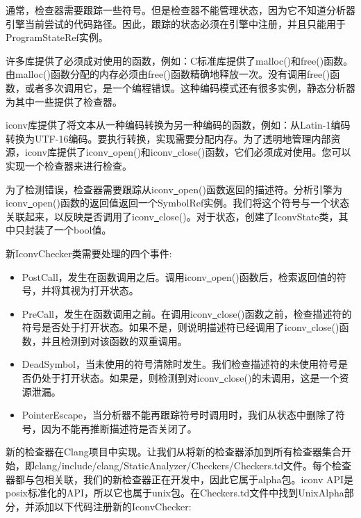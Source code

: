 通常，检查器需要跟踪一些符号。但是检查器不能管理状态，因为它不知道分析器引擎当前尝试的代码路径。因此，跟踪的状态必须在引擎中注册，并且只能用于ProgramStateRef实例。\par

许多库提供了必须成对使用的函数，例如：C标准库提供了malloc()和free()函数。由malloc()函数分配的内存必须由free()函数精确地释放一次。没有调用free()函数，或者多次调用它，是一个编程错误。这种编码模式还有很多实例，静态分析器为其中一些提供了检查器。\par

iconv库提供了将文本从一种编码转换为另一种编码的函数，例如：从Latin-1编码转换为UTF-16编码。要执行转换，实现需要分配内存。为了透明地管理内部资源，iconv库提供了iconv\underline{~}open()和iconv\underline{~}close()函数，它们必须成对使用。您可以实现一个检查器来进行检查。\par

为了检测错误，检查器需要跟踪从iconv\underline{~}open()函数返回的描述符。分析引擎为iconv\underline{~}open()函数的返回值返回一个SymbolRef实例。我们将这个符号与一个状态关联起来，以反映是否调用了iconv\underline{~}close()。对于状态，创建了IconvState类，其中只封装了一个bool值。\par

新IconvChecker类需要处理的四个事件:\par

\begin{itemize}
\item PostCall，发生在函数调用之后。调用iconv\underline{~}open()函数后，检索返回值的符号，并将其视为打开状态。

\item PreCall，发生在函数调用之前。在调用iconv\underline{~}close()函数之前，检查描述符的符号是否处于打开状态。如果不是，则说明描述符已经调用了iconv\underline{~}close()函数，并且检测到对该函数的双重调用。

\item DeadSymbol，当未使用的符号清除时发生。我们检查描述符的未使用符号是否仍处于打开状态。如果是，则检测到对iconv\underline{~}close()的未调用，这是一个资源泄漏。

\item PointerEscape，当分析器不能再跟踪符号时调用时，我们从状态中删除了符号，因为不能再推断描述符是否关闭了。

\end{itemize}

新的检查器在Clang项目中实现。让我们从将新的检查器添加到所有检查器集合开始，即clang/include/clang/StaticAnalyzer/Checkers/Checkers.td文件。每个检查器都与包相关联，我们的新检查器正在开发中，因此它属于alpha包。iconv API是posix标准化的API，所以它也属于unix包。在Checkers.td文件中找到UnixAlpha部分，并添加以下代码注册新的IconvChecker:\par

